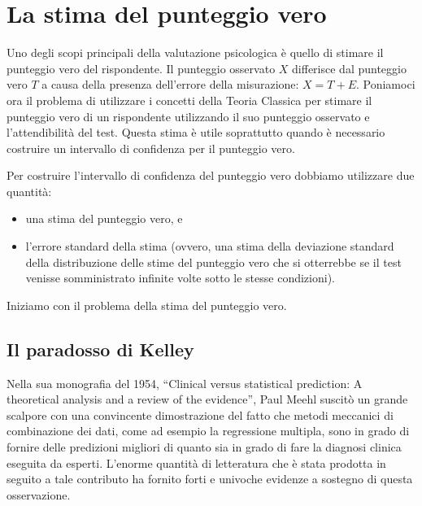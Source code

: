 \chapter{La stima del punteggio vero}
\label{ch:err_stnd_stima}

Uno degli scopi principali della valutazione psicologica è quello di stimare il punteggio vero del rispondente. Il punteggio osservato $X$ differisce dal punteggio vero $T$ a causa della presenza dell'errore della misurazione:
$X = T + E$. Poniamoci ora il problema di utilizzare i concetti della Teoria Classica  per  stimare il punteggio vero di un rispondente utilizzando il suo punteggio osservato  e l'attendibilità del test. Questa stima è utile soprattutto quando è necessario costruire un intervallo di confidenza per il punteggio vero.

Per costruire l'intervallo di confidenza del punteggio vero dobbiamo utilizzare due quantità: 
\begin{itemize}
\item 
una stima del punteggio vero, e 
\item  l'errore standard della stima (ovvero, una stima della deviazione standard della distribuzione delle stime del punteggio vero che si otterrebbe se il test venisse somministrato infinite volte sotto le stesse condizioni). 
\end{itemize}
Iniziamo con il problema della stima del punteggio vero.


\section{Il paradosso di Kelley}

Nella sua monografia del 1954, \enquote{Clinical versus statistical prediction: A theoretical analysis and a review of the evidence}, Paul Meehl suscitò un grande scalpore con una convincente dimostrazione del fatto che metodi meccanici di combinazione dei dati, come ad esempio la regressione multipla, sono in grado di fornire delle predizioni migliori di quanto sia in grado di fare la diagnosi clinica eseguita da esperti.
L'enorme quantità di letteratura che è stata prodotta in seguito a tale contributo ha fornito forti e univoche evidenze a sostegno di questa osservazione. 


